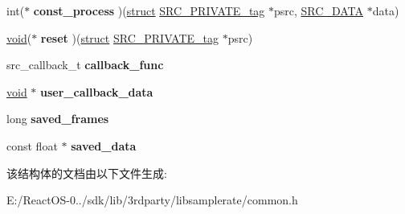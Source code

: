 \begin{DoxyCompactItemize}
\item 
\mbox{\label{struct_s_r_c___p_r_i_v_a_t_e__tag_a3d546808bd5549d825a6f7a199de1cdb}} 
int($\ast$ {\bfseries const\+\_\+process} )(\hyperlink{interfacestruct}{struct} \hyperlink{struct_s_r_c___p_r_i_v_a_t_e__tag}{S\+R\+C\+\_\+\+P\+R\+I\+V\+A\+T\+E\+\_\+tag} $\ast$psrc, \hyperlink{struct_s_r_c___d_a_t_a}{S\+R\+C\+\_\+\+D\+A\+TA} $\ast$data)
\item 
\mbox{\label{struct_s_r_c___p_r_i_v_a_t_e__tag_ac42a9d641fe361f861875ef3a2666214}} 
\hyperlink{interfacevoid}{void}($\ast$ {\bfseries reset} )(\hyperlink{interfacestruct}{struct} \hyperlink{struct_s_r_c___p_r_i_v_a_t_e__tag}{S\+R\+C\+\_\+\+P\+R\+I\+V\+A\+T\+E\+\_\+tag} $\ast$psrc)
\item 
\mbox{\label{struct_s_r_c___p_r_i_v_a_t_e__tag_ab987911aef6230a455860df798575052}} 
src\+\_\+callback\+\_\+t {\bfseries callback\+\_\+func}
\item 
\mbox{\label{struct_s_r_c___p_r_i_v_a_t_e__tag_abda4ba73f5fde4f69f68ebd5edc14a7b}} 
\hyperlink{interfacevoid}{void} $\ast$ {\bfseries user\+\_\+callback\+\_\+data}
\item 
\mbox{\label{struct_s_r_c___p_r_i_v_a_t_e__tag_a257ea097951eeed80f35df79f65d83ee}} 
long {\bfseries saved\+\_\+frames}
\item 
\mbox{\label{struct_s_r_c___p_r_i_v_a_t_e__tag_aa3d41c644f59e58d23a5bc402ded6157}} 
const float $\ast$ {\bfseries saved\+\_\+data}
\end{DoxyCompactItemize}


该结构体的文档由以下文件生成\+:\begin{DoxyCompactItemize}
\item 
E\+:/\+React\+O\+S-\/0../sdk/lib/3rdparty/libsamplerate/common.\+h\end{DoxyCompactItemize}
